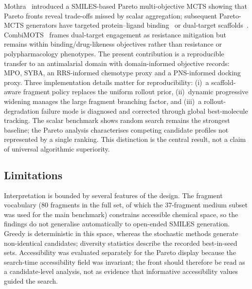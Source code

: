 \documentclass[10pt,a4paper]{article}
\begin{document}
Mothra~\citep{Mothra2024} introduced a SMILES-based Pareto multi-objective MCTS showing that Pareto fronts reveal trade-offs missed by scalar aggregation; subsequent Pareto-MCTS generators have targeted protein--ligand binding~\citep{ParetoDrug2024} or dual-target scaffolds~\citep{CombiMOTS2026}. CombiMOTS~\citep{CombiMOTS2026} frames dual-target engagement as resistance mitigation but remains within binding/drug-likeness objectives rather than resistance or polypharmacology phenotypes. The present contribution is a reproducible transfer to an antimalarial domain with domain-informed objective records: MPO, SYBA, an RRS-informed chemotype proxy and a PNS-informed docking proxy. Three implementation details matter for reproducibility: (i)~a scaffold-aware fragment policy replaces the uniform rollout prior, (ii)~dynamic progressive widening manages the large fragment branching factor, and (iii)~a rollout-degradation failure mode is diagnosed and corrected through global best-molecule tracking. The scalar benchmark shows random search remains the strongest baseline; the Pareto analysis characterises competing candidate profiles not represented by a single ranking. This distinction is the central result, not a claim of universal algorithmic superiority.

\subsection{Limitations}

Interpretation is bounded by several features of the design. The fragment vocabulary (\num{80} fragments in the full set, of which the \num{37}-fragment medium subset was used for the main benchmark) constrains accessible chemical space, so the findings do not generalise automatically to open-ended SMILES generation. Greedy is deterministic in this space, whereas the stochastic methods generate non-identical candidates; diversity statistics describe the recorded best-in-seed sets. Accessibility was evaluated separately for the Pareto display because the search-time accessibility field was invariant; the front should therefore be read as a candidate-level analysis, not as evidence that informative accessibility values guided the search.
\end{document}
